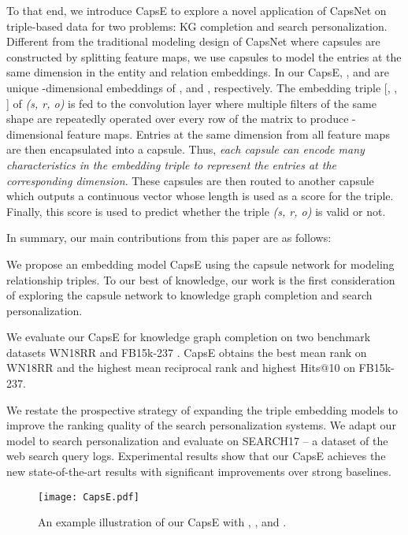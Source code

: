 \documentclass[11pt,a4paper]{article}
\begin{document}
To that end, we introduce CapsE to explore a novel application of CapsNet on triple-based data for two problems: KG completion and search personalization. Different from the traditional modeling design of CapsNet where capsules are constructed by splitting feature maps, we use capsules to model the entries at the same dimension in the entity and relation embeddings.
In our CapsE, ,  and  are unique -dimensional embeddings of ,  and , respectively. 
The embedding triple [, , ] of \textit{(s, r, o)} is fed to the convolution layer where multiple filters of the same  shape are repeatedly operated over every row of the matrix to produce  -dimensional feature maps.
Entries at the same dimension from all feature maps are then encapsulated into a capsule.
Thus, \textit{each capsule can encode many characteristics in the embedding triple to represent the entries at the corresponding dimension}.
These capsules are then routed to another capsule which outputs a continuous vector whose length is used as a score for the triple.
Finally, this score is used to predict whether the triple \textit{(s, r, o)} is valid or not.

In summary, our main contributions from this paper are as follows:

 We propose an embedding model CapsE using the capsule network \citep{sabour2017dynamic} for modeling relationship triples.
To our best of knowledge, our work is the first consideration of exploring the capsule network to knowledge graph completion and search personalization.

 We evaluate our  CapsE for knowledge graph completion on two benchmark datasets WN18RR \citep{Dettmers2017} and FB15k-237 \citep{toutanova-chen:2015:CVSC}. CapsE obtains the best mean rank on WN18RR and the highest mean reciprocal rank and highest Hits@10 on FB15k-237.

 We restate the prospective strategy of expanding the triple embedding models to improve the ranking quality of the search personalization systems.
We adapt our model to search personalization and evaluate on SEARCH17 \citep{vu2017search} -- a dataset of the web search query logs.  Experimental  results show  that our CapsE achieves the new state-of-the-art results with significant improvements over strong baselines.



\begin{figure*}[ht]
\centering
\texttt{[image: CapsE.pdf]}
\caption{An example illustration of our CapsE with , , and .}
\label{fig:model}
\end{figure*}
\end{document}
